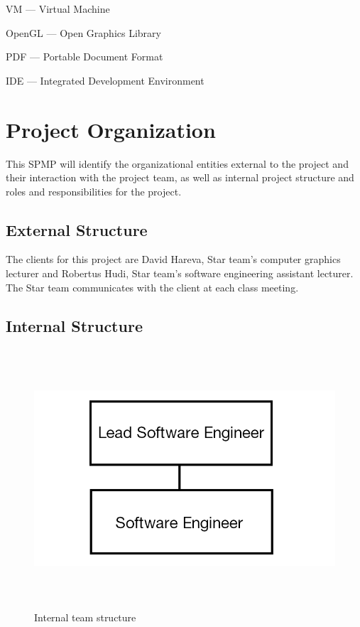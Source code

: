 \documentclass[12pt,letterpaper]{article}
\begin{document}
	\vspace{0.1in}\noindent VM --- Virtual Machine
	
	\vspace{0.1in}\noindent OpenGL --- Open Graphics Library
	
	\vspace{0.1in}\noindent PDF --- Portable Document Format
	
	\vspace{0.1in}\noindent IDE --- Integrated Development Environment
	
	\clearpage
	\section{Project Organization}
	This SPMP will identify the organizational entities external to the project and their interaction with the project team, as well as internal project structure and roles and responsibilities for the project. 
	
	\subsection{External Structure}
	The clients for this project are David Hareva, Star team's computer graphics lecturer and Robertus Hudi, Star team's software engineering assistant lecturer. The Star team communicates with the client at each class meeting.
	
	\subsection{Internal Structure}
	\begin{figure}[h]
		\includegraphics[width=6.5in,height=3.79in]{fig_1.png} 
		\caption{Internal team structure}
		\label{fig:f1}
	\end{figure}
	
\end{document}
